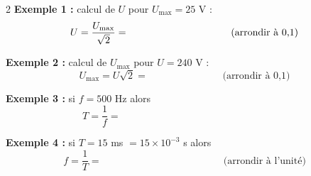 \documentclass[11pt,a4paper]{article}
\begin{document}
\vfill 
\begin{multicols}{2}
\textbf{Exemple 1 :} calcul de $U$ pour $U_{\text{max}} = 25$ V :
\begin{equation*}
U = \frac{U_{\text{max}}}{\sqrt{2}}  = \hspace{3.5cm}  \text{ (arrondir à 0,1)}
\end{equation*}

\textbf{Exemple 2 :} calcul de $U_{\text{max}}$ pour $U = 240$ V :
\begin{equation*}
U_{\text{max}} = U \sqrt{2} = \hspace{3cm}  \text{ (arrondir à 0,1)}
\end{equation*}

\textbf{Exemple 3 :} si $f = 500$ Hz alors
\begin{equation*}
T = \frac{1}{f}  = \hspace{7cm} 
\end{equation*}

\textbf{Exemple 4 :} si $T = 15$ ms $= 15 \times 10^{-3}$ s alors
\begin{equation*}
f = \frac{1}{T} = \hspace{5cm}  \text{ (arrondir à l'unité)}
\end{equation*}
\end{multicols}
\vfill 
\end{document}
